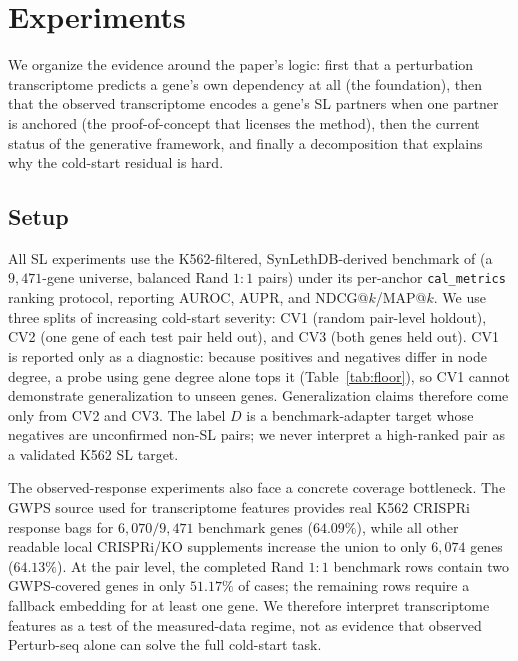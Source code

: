 \section{Experiments}
\label{sec:experiments}


We organize the evidence around the paper's logic: first that a perturbation
transcriptome predicts a gene's own dependency at all (the foundation), then that
the observed transcriptome encodes a gene's SL partners when one partner is
anchored (the proof-of-concept that licenses the method), then the current status
of the generative framework, and finally a decomposition that explains why the
cold-start residual is hard.

\subsection{Setup}
\label{sec:exp-setup}

All SL experiments use the K562-filtered, SynLethDB-derived benchmark of
\citet{feng2024benchmarking} (a $9{,}471$-gene universe, balanced Rand $1{:}1$
pairs) under its per-anchor \texttt{cal\_metrics} ranking protocol, reporting
AUROC, AUPR, and NDCG@$k$/MAP@$k$. We use three splits of increasing cold-start
severity: CV1 (random pair-level holdout), CV2 (one gene of each test pair held
out), and CV3 (both genes held out). CV1 is reported only as a diagnostic:
because positives and negatives differ in node degree, a probe using gene degree
alone tops it (Table~\ref{tab:floor}), so CV1 cannot demonstrate generalization
to unseen genes. Generalization claims therefore come only from CV2 and CV3. The
label $D$ is a benchmark-adapter target whose negatives are unconfirmed non-SL
pairs; we never interpret a high-ranked pair as a validated K562 SL target.

The observed-response experiments also face a concrete coverage bottleneck. The
GWPS source used for transcriptome features provides real K562 CRISPRi response
bags for $6{,}070/9{,}471$ benchmark genes ($64.09\%$), while all other readable
local CRISPRi/KO supplements increase the union to only $6{,}074$ genes
($64.13\%$). At the pair level, the completed Rand $1{:}1$ benchmark rows contain
two GWPS-covered genes in only $51.17\%$ of cases; the remaining rows require a
fallback embedding for at least one gene. We therefore interpret transcriptome
features as a test of the measured-data regime, not as evidence that observed
Perturb-seq alone can solve the full cold-start task.

